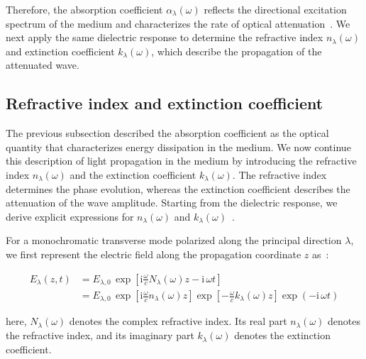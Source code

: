 Therefore, the absorption coefficient $\alpha_{\lambda}(\omega)$ reflects the directional excitation spectrum of the medium and characterizes the rate of optical attenuation~\cite{niu2024electronic,khan2025insight,zhang2024advanced,elbanna20232d}.
We next apply the same dielectric response to determine the refractive index $n_{\lambda}(\omega)$ and extinction coefficient $k_{\lambda}(\omega)$,
which describe the propagation of the attenuated wave.

\subsection{Refractive index and extinction coefficient}

The previous subsection described the absorption coefficient as the optical quantity that characterizes energy dissipation in the medium.
We now continue this description of light propagation in the medium by introducing the refractive index $n_{\lambda}(\omega)$ and the extinction coefficient $k_{\lambda}(\omega)$.
The refractive index determines the phase evolution,
whereas the extinction coefficient describes the attenuation of the wave amplitude.
Starting from the dielectric response,
we derive explicit expressions for $n_{\lambda}(\omega)$ and $k_{\lambda}(\omega)$~\cite{born2013principles,wooten2013optical,dressel2002electrodynamics,fox2010optical}.

For a monochromatic transverse mode polarized along the principal direction $\lambda$,
we first represent the electric field along the propagation coordinate $z$ as~\cite{politano2023spectroscopic}:

\begin{equation}
\begin{aligned}
    E_{\lambda}(z,t)
    &= E_{\lambda,0}\,
    \exp\left[\mathrm{i}\frac{\omega}{c}N_{\lambda}(\omega)z-\mathrm{i}\,\omega t\right]\\
    &= E_{\lambda,0}\,
    \exp\left[\mathrm{i}\frac{\omega}{c}n_{\lambda}(\omega)z\right]
    \exp\left[-\frac{\omega}{c}k_{\lambda}(\omega)z\right]
    \exp\left(-\mathrm{i}\,\omega t\right)
\end{aligned}
\label{monochromatic_wave_with_complex_refractive_index}
\end{equation}

here, $N_{\lambda}(\omega)$ denotes the complex refractive index.
Its real part $n_{\lambda}(\omega)$ denotes the refractive index,
and its imaginary part $k_{\lambda}(\omega)$ denotes the extinction coefficient.

